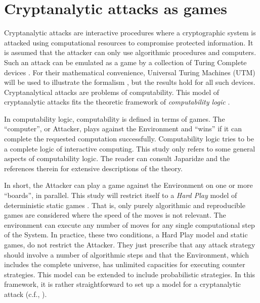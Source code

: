 \documentclass{article}
\begin{document}
\section{Cryptanalytic attacks as games}\label{sectCryptGames}

Cryptanalytic attacks are interactive procedures where a cryptographic system
is attacked using computational resources to compromise protected
information. 
It is assumed that the attacker can only use algorithmic 
procedures and computers. Such an attack can
be emulated as a game by a collection of Turing Complete devices 
\cite{Shannon1949,NeumanMorgenstern1947}. For their mathematical
convenience, Universal Turing Machines (UTM) will be used to illustrate the
formalism \cite{Turing1936CNA}, but the results hold for all such devices.
Cryptanalytical attacks are problems of computability. 
This model of
cryptanalytic attacks fits the theoretic framework 
of \textit{computability logic} 
\cite{Japaridze03,japaridze2004,japaridze2005,GiorgiJaparidze08012006}.

In computability logic, computability is defined in terms of games.
The ``computer'', or Attacker, plays against the Environment and ``wins'' if it
can complete
the requested computation successfully. Computability logic tries to be
a complete logic of interactive computing. This study only refers to some
general aspects of computability logic. The reader can consult Japaridze
\cite{japaridze2005,GiorgiJaparidze08012006} and the references therein for
extensive descriptions of the theory.

In short, the Attacker can play a game against the Environment on one or more
``boards'', in parallel. This study will restrict itself to a \textit{Hard Play} model
of deterministic static
games \cite{japaridze2005}. That is, only purely algorithmic and reproducible
games are considered where the speed of the moves is not relevant.
The environment can execute
any number of moves for any single
computational step of the System. In practice, these two conditions, a
Hard Play model and static games, do not restrict the Attacker. They
just prescribe
that any attack strategy should involve a number of algorithmic steps and that
the Environment, which includes the complete universe, has unlimited
capacities for executing counter strategies. This model can be extended
to include probabilistic strategies.
In this framework, it is rather
straightforward to set up a model for a cryptanalytic attack
(c.f., \cite{NeumanMorgenstern1947,Shannon1949}).
\end{document}
